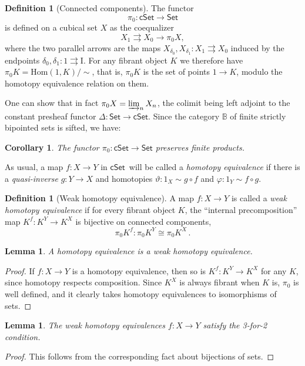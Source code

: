 \documentclass[12pt]{article}
\newcommand{\B}{\ensuremath{\mathbb{B}}}
\newcommand{\Set}{\ensuremath{\mathsf{Set}}}
\newcommand{\cSet}{\ensuremath{\mathsf{cSet}}}
\renewcommand{\hom}{\ensuremath{\mathrm{Hom}}}
\newcommand{\ra}{\ensuremath{\rightarrow}}
\newcommand{\I}{\ensuremath{\mathrm{I}}}
\newtheorem{lemma}[theorem]{Lemma}
\newtheorem{corollary}[theorem]{Corollary}
\theoremstyle{remark}
\theoremstyle{definition}
\newtheorem{definition}[theorem]{Definition}
\begin{document}
\begin{definition}[Connected components]
The functor $$\pi_0 : \cSet\ra\Set$$ is defined on a cubical set $X$ as the coequalizer $$X_1\rightrightarrows X_0\ra \pi_0X,$$ where the two parallel arrows are the maps $X_{\delta_0}, X_{\delta_1} : X_1 \rightrightarrows X_0$ induced by the endpoints $\delta_0, \delta_1 : 1 \rightrightarrows \I$.   For any fibrant object $K$ we therefore have $\pi_0K = \hom(1,K)/\!\!\sim$, that is, $\pi_0K$ is the set of points $1\ra K$, modulo the homotopy equivalence relation on them.
\end{definition}

One can show that in fact $\pi_0X = \varinjlim_n X_n$, the colimit being left adjoint to the constant presheaf functor $\Delta : \Set\ra\cSet$. Since the category $\B$ of finite strictly bipointed sets is sifted, we have:

\begin{corollary}
The functor $\pi_0: \cSet\ra\Set$ preserves finite products. 
\end{corollary}

As usual, a map $f: X\ra Y$ in \cSet\ will be called a \emph{homotopy equivalence} if there is a \emph{quasi-inverse} $g: Y\ra X$ and homotopies $\vartheta : 1_X \sim g\circ f$ and $\varphi : 1_Y\sim f\circ g$.

\begin{definition}[Weak homotopy equivalence]\label{def:WHE}
A map $f: X\ra Y$ is called a \emph{weak homotopy equivalence} if for every fibrant object $K$, the ``internal precomposition'' map $K^f : K^Y \ra K^X$ is bijective on connected components,  $$\pi_0K^f : \pi_0K^Y \cong \pi_0K^X\,.$$
\end{definition}

\begin{lemma}\label{lemma:HEisWHE}
A homotopy equivalence is a weak homotopy equivalence.
\end{lemma}
\begin{proof}
If $f: X\ra Y$ is a homotopy equivalence, then so is $K^f : K^Y \ra K^X$ for any $K$, since homotopy respects composition. Since $K^X$ is always fibrant when $K$ is, $\pi_0$ is well defined, and it clearly takes homotopy equivalences to isomorphisms of sets.
\end{proof}


\begin{lemma}
The weak homotopy equivalences $f : X\ra Y$ satisfy the 3-for-2 condition. 
\end{lemma}
\begin{proof}
This follows from the corresponding fact about bijections of sets.
\end{proof}
\end{document}

